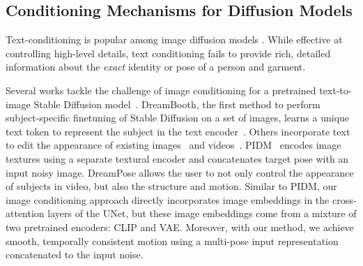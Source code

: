     \subsection{Conditioning Mechanisms for Diffusion Models}
        Text-conditioning is popular among image diffusion models \cite{stable_diffusion,hierarchical_text_conditional,photorealistic_text2img_diffusion}. While effective at controlling high-level details, text conditioning fails to provide rich, detailed information about the \textit{exact} identity or pose of a person and garment. 
        
        Several works tackle the challenge of image conditioning for a pretrained text-to-image Stable Diffusion model~\cite{universal_guidance,instruct_pix2pix,encoder_personalization,dreamix,dreambooth,3dim}. %
        DreamBooth, the first method to perform subject-specific finetuning of Stable Diffusion on a set of images, learns a unique text token to represent the subject in the text encoder~\cite{dreambooth}. Others incorporate text to edit the appearance of existing images~\cite{instruct_pix2pix} and videos~\cite{tune-a-video,dreamix}. PIDM~\cite{pose-transfer-dm} encodes image textures using a separate textural encoder and concatenates target pose with an input noisy image.
        DreamPose allows the user to not only control the appearance of subjects in video, but also the structure and motion. Similar to PIDM, our image conditioning approach directly incorporates image embeddings in the cross-attention layers of the UNet, but these image embeddings come from a mixture of two pretrained encoders: CLIP and VAE. Moreover, with our method, we achieve smooth, temporally consistent motion using a multi-pose input representation concatenated to the input noise.
    
